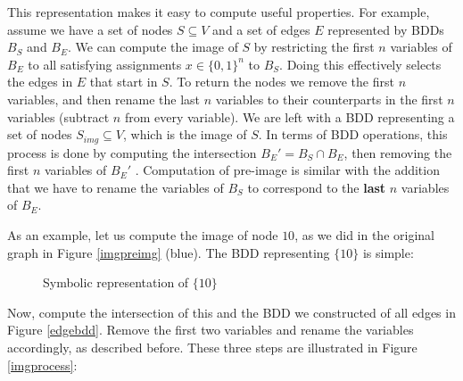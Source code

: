 \documentclass[../master/master.tex]{subfiles}
\begin{document}
This representation makes it easy to compute useful properties. For example, assume we have a set of nodes $S\subseteq V$ and a set of edges $E$ represented by BDDs $B_S$ and $B_E$. We can compute the image of $S$ by restricting the first $n$ variables of $B_E$ to all satisfying assignments $x\in\{0,1\}^{n}$ to $B_S$. Doing this effectively selects the edges in $E$ that start in $S$. To return the nodes we remove the first $n$ variables, and then rename the last $n$ variables to their counterparts in the first $n$ variables (subtract $n$ from every variable). We are left with a BDD representing a set of nodes $S_{img}\subseteq V$, which is the image of $S$. In terms of BDD operations, this process is done by computing the intersection $B_{E}' = B_S\cap B_E$, then removing the first $n$ variables of $B_E'$ . Computation of pre-image is similar with the addition that we have to rename the variables of $B_S$ to correspond to the \textbf{last} $n$ variables of $B_E$.

As an example, let us compute the image of node $10$, as we did in the original graph in Figure \ref{imgpreimg} (blue). The BDD representing $\{10\}$ is simple:

\begin{figure}[H]
\center
{}
\caption{Symbolic representation of $\{10\}$}
\end{figure}
Now, compute the intersection of this and the BDD we constructed of all edges in Figure \ref{edgebdd}. Remove the first two variables and rename the variables accordingly, as described before. These three steps are illustrated in Figure  \ref{imgprocess}:
\end{document}
